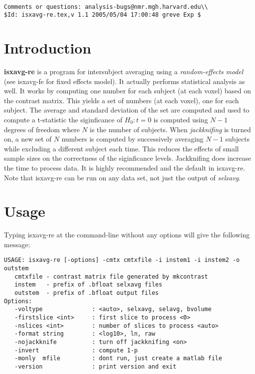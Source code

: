 \documentclass[10pt]{article}
\begin{document}
\begin{Large}
 \\
\end{Large}

\noindent 
\begin{verbatim}
Comments or questions: analysis-bugs@nmr.mgh.harvard.edu\\
$Id: isxavg-re.tex,v 1.1 2005/05/04 17:00:48 greve Exp $
\end{verbatim}

\section{Introduction}

{\bf isxavg-re} is a program for intersubject averaging using a {\em
random-effects model} (see isxavg-fe for fixed effects model).  It
actually performs statistical analysis as well.  It works by computing
one number for each subject (at each voxel) based on the contrast
matrix.  This yields a set of numbers (at each voxel), one for each
subject.  The average and standard deviation of the set are computed
and used to compute a t-statistic the siginficance of $H_0: t=0$ is
computed using $N-1$ degrees of freedom where $N$ is the number of
subjects.  When {\em jackknifing} is turned on, a new set of $N$
numbers is computed by successively averaging $N-1$ subjects while
excluding a different subject each time.  This reduces the effects of
small sample sizes on the correctness of the siginficance levels.
Jackknifing does increase the time to process data.  It is highly
recommended and the default in isxavg-re.  Note that isxavg-re can be
run on any data set, not just the output of {\em selxavg}.

\section{Usage}
Typing isxavg-re at the command-line without any options will give the
following message:\\ 

\begin{small}
\begin{verbatim}
USAGE: isxavg-re [-options] -cmtx cmtxfile -i instem1 -i instem2 -o outstem
   cmtxfile - contrast matrix file generated by mkcontrast
   instem   - prefix of .bfloat selxavg files
   outstem  - prefix of .bfloat output files
Options:
   -voltype              : <auto>, selxavg, selavg, bvolume
   -firstslice <int>     : first slice to process <0>
   -nslices <int>        : number of slices to process <auto>
   -format string        : <log10>, ln, raw
   -nojackknife          : turn off jackknifing <on> 
   -invert               : compute 1-p
   -monly  mfile         : dont run, just create a matlab file
   -version              : print version and exit
\end{verbatim}
\end{small}
\end{document}

